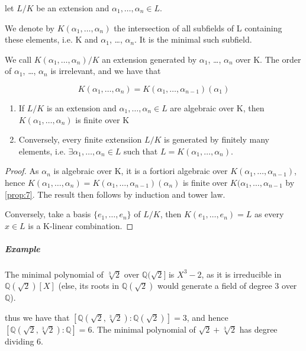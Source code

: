 \begin{definition}\label{def:9}
  let $L/K$ be an extension and $\alpha_1, \ldots, \alpha_n \in L$. 

  We denote by $K(\alpha_1, \ldots ,\alpha_n)$ the intersection of all subfields of L containing these elements, i.e. K and $\alpha_1$, \ldots, $\alpha_n$. It is the minimal such subfield.

  We call $K(\alpha_1, \ldots, \alpha_n)/K$ an extension generated by $\alpha_1$, \ldots, $\alpha_n$ over K. The order of $\alpha_1$, \ldots, $\alpha_n$ is irrelevant, and we have that

  \begin{equation*}
    K(\alpha_1, \ldots, \alpha_n) = K(\alpha_1, \ldots, \alpha_{n-1})(\alpha_1)
  \end{equation*}
\end{definition}

\begin{proposition}\label{prop:10}
  \begin{enumerate}
  \item If $L/K$ is an extension and $\alpha_1, \ldots, \alpha_n \in L$ are algebraic over K, then $K(\alpha_1, \ldots, \alpha_n)$ is finite over K
  \item Conversely, every finite extensiion $L/K$ is generated by finitely many elements, i.e. $\exists \alpha_1, \ldots, \alpha_n \in L$ such that $L = K(\alpha_1, \ldots, \alpha_n)$.
  \end{enumerate}
\end{proposition}

\begin{proof}
  As $\alpha_n$ is algebraic over K, it is a fortiori algebraic over $K(\alpha_1, \ldots, \alpha_{n-1})$, hence $K(\alpha_1, \ldots, \alpha_n) = K(\alpha_1, \ldots, \alpha_{n-1})(\alpha_n)$ is finite over $K(\alpha_1, \ldots, \alpha_{n-1}$ by \ref{prop:7}. The result then follows by induction and tower law.

Conversely, take a basis $\{e_1, \ldots, e_n\}$ of $L/K$, then $K(e_1, \ldots, e_n) = L$ as every $x \in L$ is a K-linear combination. 
\end{proof}

\subparagraph{Example}
The minimal polynomial of $\sqrt[3]{2}$ over $\mathbb{Q}(\sqrt{2}]$ is $X^3 -2$, as it is irreducible in $\mathbb{Q}(\sqrt{2})[X]$ (else, its roots in $\mathbb{Q}(\sqrt{2})$ would generate a field of degree 3 over $\mathbb{Q}$).
\begin{figure}[H]
  \centering
\end{figure}
thus we have that $[\mathbb{Q}(\sqrt{2}, \sqrt[3]{2}) : \mathbb{Q}(\sqrt{2})] = 3$, and hence $[\mathbb{Q}(\sqrt{2}, \sqrt[3]{2}) : \mathbb{Q}] = 6$. The minimal polynomial of $\sqrt{2} + \sqrt[3]{2}$ has degree dividing 6.

